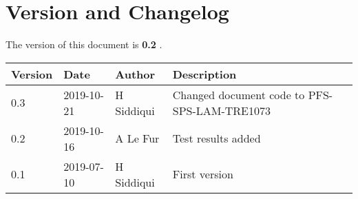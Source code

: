 \section{Version and Changelog}

The version of this document is {\bf 0.2} .

\begin{table}[H]
    \begin{tabular}{|l|l|l|p{10cm}| }
    \hline
    {\bf Version} & {\bf Date} & {\bf Author} & {\bf Description} \\ \hline
    0.3 & 2019-10-21 & H Siddiqui & Changed document code to PFS-SPS-LAM-TRE1073 \\ \hline
    0.2 & 2019-10-16 & A Le Fur & Test results added \\ \hline
    0.1 & 2019-07-10 & H Siddiqui & First version \\ \hline
    \end{tabular}
\end{table}

